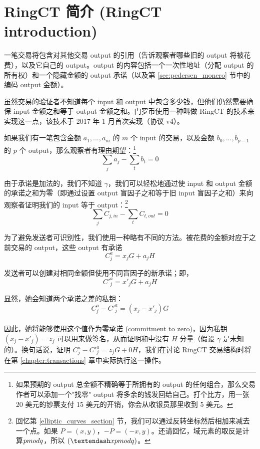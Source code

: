 \section{RingCT 简介 (RingCT introduction)}
\label{sec:ringct-introduction}

一笔交易将包含对其他交易 output 的引用（告诉观察者哪些旧的 output 将被花费），以及它自己的 output。output 的内容包括一个一次性地址（分配 output 的所有权）和一个隐藏金额的 output 承诺（以及第 \ref{sec:pedersen_monero} 节中的编码 output 金额）。

虽然交易的验证者不知道每个 input 和 output 中包含多少钱，但他们仍然需要确保 input 金额之和等于 output 金额之和。门罗币使用一种叫做 RingCT \cite{MRL-0005-ringct} 的技术来实现这一点，该技术于 2017 年 1 月首次实现（协议 v4）。

如果我们有一笔包含金额 \(a_1, ..., a_m\) 的 $m$ 个 input 的交易，以及金额 \(b_0, ..., b_{p-1}\) 的 $p$ 个 output，那么观察者有理由期望：\footnote{如果预期的 output 总金额不精确等于所拥有的 output 的任何组合，那么交易作者可以添加一个"找零" output 将多余的钱发回给自己。打个比方，用一张 20 美元的钞票支付 15 美元的开销，你会从收银员那里收到 5 美元。}\vspace{.175cm}
\[\sum_j a_j - \sum_t b_t = 0\]

由于承诺是加法的，我们不知道 $\gamma$，我们可以轻松地通过使 input 和 output 金额的承诺之和为零（即通过设置 output 盲因子之和等于旧 input 盲因子之和）来向观察者证明我们的 input 等于 output：\footnote{回忆第 \ref{elliptic_curves_section} 节，我们可以通过反转坐标然后相加来减去一个点。如果 $P = (x, y)$，$-P = (-x, y)$。还请回忆，域元素的取反是计算$\\pmod q$，所以 $(–x \\pmod q)$。}\vspace{.175cm}
\[\sum_{j}{C_{j, in}} - \sum_{t}{C_{t, out}} = 0\]

为了避免发送者可识别性，我们使用一种略有不同的方法。被花费的金额对应于之前交易的 output，这些 output 有承诺\vspace{.175cm}
\[C^a_{j} = x_j G + a_j H\]

发送者可以创建对相同金额但使用不同盲因子的新承诺；即，
\[C'^a_{j} = x'_j G + a_j H\]

显然，她会知道两个承诺之差的私钥：\vspace{.175cm}
\[C^a_{j} - C'^a_{j} = (x_j - x'_j) G\]\\
因此，她将能够使用这个值作为{零承诺 (commitment to zero)}，因为私钥 $(x_j - x'_j) = z_j$ 可以用来做签名，从而证明和中没有 $H$ 分量（假设 $\gamma$ 是未知的）。换句话说，证明 $C^a_{j} - C'^a_{j} = z_j G + 0H$，我们在讨论 RingCT 交易结构时将在第 \ref{chapter:transactions} 章中实际执行这一操作。

